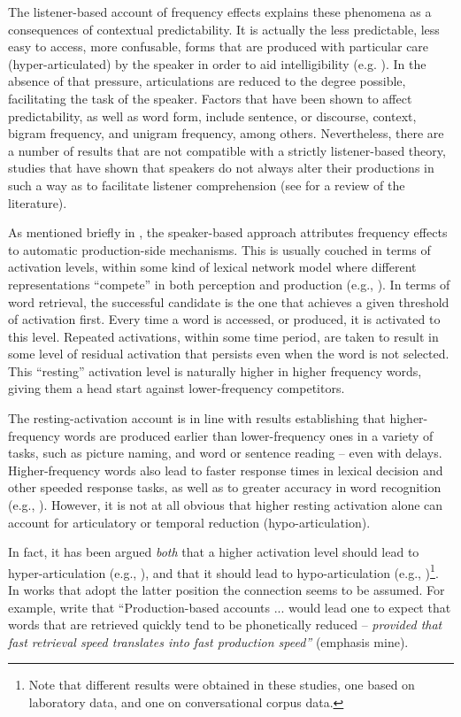 The listener-based account of frequency effects explains these phenomena
as a consequences of contextual predictability. It is actually the
less predictable, less easy to access, more confusable, forms that
are produced with particular care (hyper-articulated) by the speaker
in order to aid intelligibility (e.g. \citeauthor{Aylett2004}). In
the absence of that pressure, articulations are reduced to the degree
possible, facilitating the task of the speaker. Factors that have
been shown to affect predictability, as well as word form, include
sentence, or discourse, context, bigram frequency, and unigram frequency,
among others. Nevertheless, there are a number of results that are
not compatible with a strictly listener-based theory, studies that
have shown that speakers do not always alter their productions in
such a way as to facilitate listener comprehension (see \citet{turnbull2015assessing}
for a review of the literature).

As mentioned briefly in , the
speaker-based approach attributes frequency effects to automatic production-side
mechanisms. This is usually couched in terms of activation levels,
within some kind of lexical network model where different representations
“compete” in both perception and production (e.g., \citealp{mcclelland1981interactive,Dell1986}).
In terms of word retrieval, the successful candidate is the one that
achieves a given threshold of activation first. Every time a word
is accessed, or produced, it is activated to this level. Repeated
activations, within some time period, are taken to result in some
level of residual activation that persists even when the word is not
selected. This “resting” activation level is naturally higher
in higher frequency words, giving them a head start against lower-frequency
competitors. 

The resting-activation account is in line with results establishing
that higher-frequency words are produced earlier than lower-frequency
ones in a variety of tasks, such as picture naming, and word or sentence
reading – even with delays. Higher-frequency words also lead to faster
response times in lexical decision and other speeded response tasks,
as well as to greater accuracy in word recognition (e.g., \citealt{howes1951visual,balota1985locus,Luce1986,Marslen-Wilson1990}).
However, it is not at all obvious that higher resting activation alone
can account for articulatory or temporal reduction (hypo-articulation).

In fact, it has been argued \emph{both} that a higher activation level
should lead to hyper-articulation (e.g., \citealt{Baese-Berk2009}),
and that it should lead to hypo-articulation (e.g., \citealt{gahl2012reduce})\footnote{Note that different results were obtained in these studies, one based
on laboratory data, and one on conversational corpus data.}. In works that adopt the latter position the connection seems to
be assumed. For example, \citet[79]{gahl2012reduce}
write that “Production-based accounts ... would lead one to expect
that words that are retrieved quickly tend to be phonetically reduced
– \emph{provided that fast retrieval speed translates into fast production
speed”} (emphasis mine).

